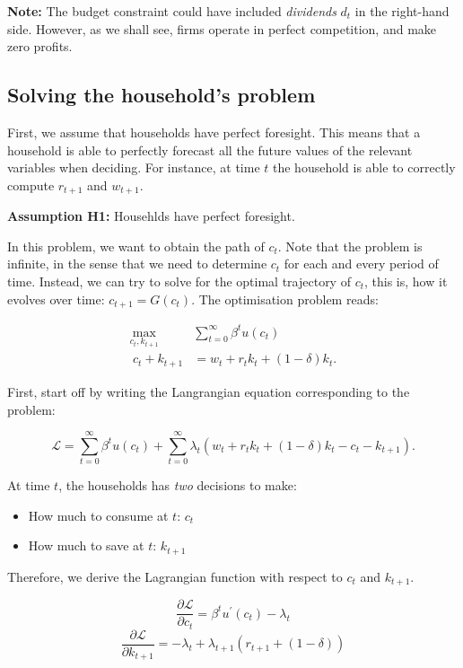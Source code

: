 \documentclass[11pt,a4paper,english]{article}
\providecommand{\tightlist}{%
  \setlength{\itemsep}{0pt}\setlength{\parskip}{0pt}}
\begin{document}
\textbf{Note:} The budget constraint could have included
\emph{dividends} \(d_{t}\) in the right-hand side. However, as we shall
see, firms operate in perfect competition, and make zero profits.

\hypertarget{solving-the-households-problem}{%
\subsection{Solving the household's
problem}\label{solving-the-households-problem}}

First, we assume that households have perfect foresight. This means that
a household is able to perfectly forecast all the future values of the
relevant variables when deciding. For instance, at time \(t\) the
household is able to correctly compute \(r_{t+1}\) and \(w_{t+1}.\)

\textbf{Assumption H1:} Househlds have perfect foresight.

In this problem, we want to obtain the path of \(c_{t}\). Note that the
problem is infinite, in the sense that we need to determine \(c_{t}\)
for each and every period of time. Instead, we can try to solve for the
optimal trajectory of \(c_{t}\), this is, how it evolves over time:
\(c_{t+1} = G(c_{t})\). The optimisation problem reads:

\begin{eqnarray}
\max_{c_{t}, k_{t+1}} & \sum_{t=0}^{\infty} \beta^{t} u(c_{t}) \\\
c_{t} + k_{t+1} & = w_{t} + r_{t} k_{t} + (1- \delta) k_{t}.
\end{eqnarray}

First, start off by writing the Langrangian equation corresponding to
the problem:

\[\mathcal{L} = \sum_{t=0}^{\infty} \beta^t u(c_{t}) + \sum_{t=0}^{\infty} \lambda_{t}(w_{t} + r_{t}k_{t} + (1-\delta)k_{t} - c_{t} - k_{t+1}).\]

At time \(t\), the households has \emph{two} decisions to make:

\begin{itemize}
\tightlist
\item
  How much to consume at \(t\): \(c_{t}\)
\item
  How much to save at \(t\): \(k_{t+1}\)
\end{itemize}

Therefore, we derive the Lagrangian function with respect to \(c_{t}\)
and \(k_{t+1}\).

\[\frac{\partial \mathcal{L}}{\partial c_{t}} = \beta^{t} u^{\prime}(c_{t}) - \lambda_{t}\]
\[\frac{\partial \mathcal{L}}{\partial k_{t+1}} = - \lambda_{t} + \lambda_{t+1}(r_{t+1}+(1-\delta))\]
\end{document}
